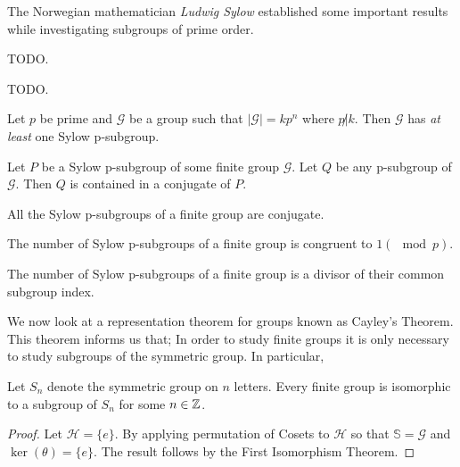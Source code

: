 The Norwegian mathematician \emph{Ludwig Sylow} established
some important results while investigating subgroups of prime
order.

\begin{defn}[p-subgroup]
	TODO.
\end{defn}

\begin{defn}
	TODO.
\end{defn}

\begin{thm}
	Let $p$ be prime and $\mathcal{G}$ be a group such that
	$\left| \mathcal{G} \right| = k p^n$ where $p\not| k$.
	Then $\mathcal{G}$ has \emph{at least} one Sylow
	p-subgroup.
\end{thm}

\begin{thm}
	Let $P$ be a Sylow p-subgroup of some finite group $\mathcal{G}$.
	Let $Q$ be any p-subgroup of $\mathcal{G}$. Then $Q$ is contained
	in a conjugate of $P$.
\end{thm}

\begin{thm}
	All the Sylow p-subgroups of a finite group are conjugate.
\end{thm}

\begin{thm}
	The number of Sylow p-subgroups of a finite group is congruent to
	$1(\mod p)$.
\end{thm}

\begin{thm}
	The number of Sylow p-subgroups of a finite group is a divisor of
	their common subgroup index.
\end{thm}

We now look at a representation theorem for groups known as Cayley's Theorem.
This theorem informs us that; In order to study finite groups it is only
necessary to study subgroups of the symmetric group. In particular,

\begin{thm}
	Let $S_n$ denote the symmetric group on $n$ letters. Every finite group
	is isomorphic to a subgroup of $S_n$ for some $n \in \mathbb{Z}$.
\end{thm}

\begin{proof}
	Let $\mathcal{H} = \{e\}$. By applying permutation of Cosets to $\mathcal{H}$
	so that $\mathbb{S} = \mathcal{G}$ and $\ker (\theta) = \{e\}$. The result
	follows by the First Isomorphism Theorem. \qedhere
\end{proof}

